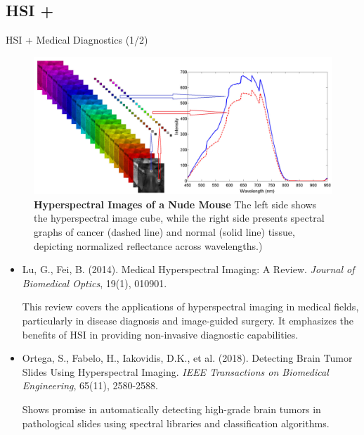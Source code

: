 \documentclass[10pt,svgnames,fragile]{beamer}
\begin{document}
\subsection{HSI + }
\begin{frame}{HSI + Medical Diagnostics (1/2)}
\footnotesize
\begin{figure}
    \centering
    \includegraphics[width=0.61\linewidth]{akabari_figure.png}
    \caption{\textbf{Hyperspectral Images of a Nude Mouse} The left side shows the hyperspectral image cube, while the right side presents spectral graphs of cancer (dashed line) and normal (solid line) tissue, depicting normalized reflectance across wavelengths.)\cite{akbariHyperspectralImagingQuantitative2012}}
    \label{fig:akabari_figure}
\end{figure}
\vspace{-0.5cm} %
\begin{itemize}
    \item Lu, G., Fei, B. (2014). Medical Hyperspectral Imaging: A Review. \textit{Journal of Biomedical Optics}, 19(1), 010901. \href{https://www.spiedigitallibrary.org/journals/journal-of-biomedical-optics/volume-19/issue-01/010901/Medical-hyperspectral-imaging-a-review/10.1117/1.JBO.19.1.010901.full}{\color{blue}{DOI: 10.1117/1.JBO.19.1.010901}}

    {\color{gray}This review covers the applications of hyperspectral imaging in medical fields, particularly in disease diagnosis and image-guided surgery. It emphasizes the benefits of HSI in providing non-invasive diagnostic capabilities.}

    \item Ortega, S., Fabelo, H., Iakovidis, D.K., et al. (2018). Detecting Brain Tumor Slides Using Hyperspectral Imaging. \textit{IEEE Transactions on Biomedical Engineering}, 65(11), 2580-2588. \href{https://consensus.app/papers/detecting-brain-tumor-slides-using-imaging-ortega/4e764c565e1852f8867aabec0ca253f4/?utm_source=chatgpt}{\color{blue}{DOI: 10.1109/TBME.2018.2847218}}

    {\color{gray}Shows promise in automatically detecting high-grade brain tumors in pathological slides using spectral libraries and classification algorithms.}
\end{itemize}
\end{frame}
\end{document}
